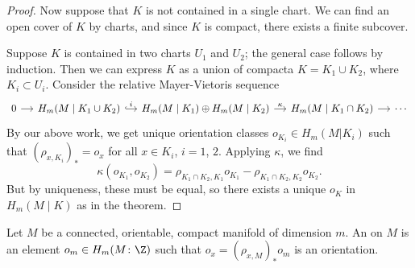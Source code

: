 \documentclass[main.tex]{subfiles}
\begin{document}
\begin{proof}
  Now suppose that \(K\) is not contained in a single chart. We can find an open cover of \(K\) by charts, and since \(K\) is compact, there exists a finite subcover.

  Suppose \(K\) is contained in two charts \(U_{1}\) and \(U_{2}\); the general case follows by induction. Then we can express \(K\) as a union of compacta \(K =  K_{1} \cup K_{2}\), where \(K_{i} \subset U_{i} \). Consider the relative Mayer-Vietoris sequence
  \begin{equation*}
    \begin{tikzcd}[column sep=small]
      0
      \arrow[r]
      & H_{m}(M\mid K_{1} \cup K_{2})
      \arrow[r, hook, "i"]
      & H_{m}(M\mid K_{1}) \oplus H_{m}(M\mid K_{2})
      \arrow[r, "\kappa"]
      & H_{m}(M\mid K_{1} \cap K_{2})
      \arrow[r]
      & \cdots
    \end{tikzcd}
  \end{equation*}
  By our above work, we get unique orientation classes \(o_{K_{i}} \in H_{m}(M | K_{i})\) such that \((\rho_{x, K_{i}})_{*} = o_{x}\) for all \(x \in K_{i}\), \(i = 1\), \(2\). Applying \(\kappa\), we find
  \begin{equation*}
    \kappa(o_{K_{1}}, o_{K_{2}}) = \rho_{K_{1} \cap K_{2}, K_{1}}o_{K_{1}} - \rho_{K_{1} \cap K_{2}, K_{2}}o_{K_{2}}.
  \end{equation*}
  But by uniqueness, these must be equal, so there exists a unique \(o_{K}\) in \(H_{m}(M \mid K)\) as in the theorem.
\end{proof}

\begin{definition}
  \label{def:orientation_class}
  Let \(M\) be a connected, orientable, compact manifold of dimension \(m\). An  on \(M\) is an element \(o_{m} \in H_{m}(M\colon \Z)\) such that \(o_{x} = (\rho_{x, M})_{*} o_{m}\)  is an orientation.
\end{definition}
\end{document}
